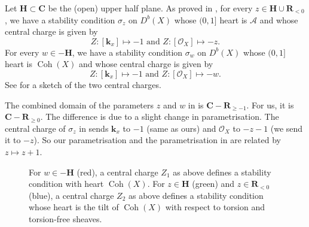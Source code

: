 \documentclass{amsart}
\begin{document}
Let \(\mathbf{H} \subset \mathbf{C}\) be the (open) upper half plane.
As proved in \cite[\S~4.2]{huy.mac.ste:08}, for every \(z \in \mathbf{H} \cup \mathbf{R}_{<0}\), we have a stability condition \(\sigma_{z}\) on \(D^b(X)\) whose \((0,1]\) heart is \(\mathcal{A}\) and whose central charge is given by
\[ Z \colon [\mathbf{k}_x] \mapsto -1 \text{ and } Z \colon [\mathcal{O}_X] \mapsto -z.\]
For every \(w \in -\mathbf{H}\), we have a stability condition \(\sigma_{w}\) on \(D^b(X)\) whose \((0,1]\) heart is \(\operatorname{Coh}(X)\) and whose central charge is given by
\[ Z \colon [\mathbf{k}_x] \mapsto -1 \text{ and } Z \colon [\mathcal{O}_X] \mapsto -w.\]
See  for a sketch of the two central charges.
\begin{remark}
  The combined domain of the parameters \(z\) and \(w\) in \cite[\S~4.2]{huy.mac.ste:08} is \(\mathbf{C} - \mathbf{R}_{\geq -1}\).
  For us, it is \(\mathbf{C} - \mathbf{R}_{\geq 0}\).
  The difference is due to a slight change in parametrisation.
  The central charge of \(\sigma_z\) in \cite[\S~4.2]{huy.mac.ste:08} sends \(\mathbf{k}_x\) to \(-1\) (same as ours)  and \(\mathcal{O}_X\) to \(-z-1\) (we send it to \(-z\)).
  So our parametrisation and the parametrisation in \cite[\S~4.2]{huy.mac.ste:08} are related by \(z \mapsto z+1\).
\end{remark}
\begin{figure}[ht]
  \centering
  \caption{For \(w \in -\mathbf{H}\) (red), a central charge \(Z_1\) as above defines a stability condition with heart \(\operatorname{Coh}(X)\). For \(z \in \mathbf{H}\) (green) and \(z \in \mathbf{R}_{<0}\) (blue), a central charge \(Z_2\) as above defines a stability condition whose heart is the tilt of \(\operatorname{Coh}(X)\) with respect to torsion and torsion-free sheaves.}
  \label{fig:standardstability}
\end{figure}
\end{document}
